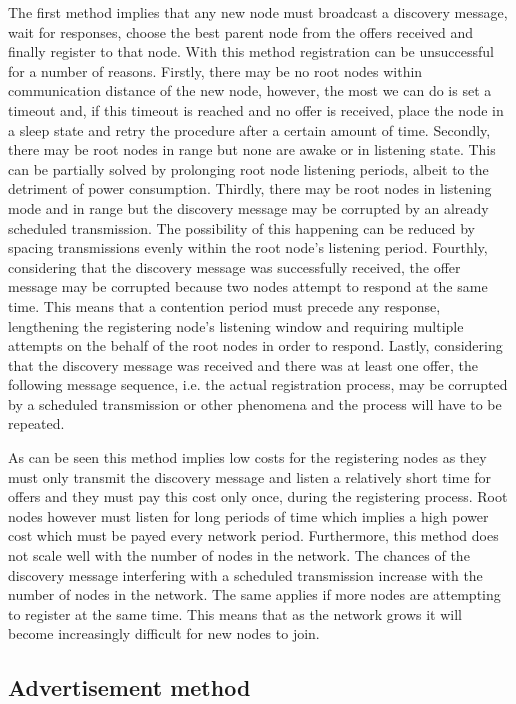 The first method implies that any new node must broadcast a discovery message,
wait for responses, choose the best parent node from the offers received and
finally register to that node. With this method registration can be
unsuccessful for a number of reasons. Firstly, there may be no root nodes
within communication distance of the new node, however, the most we can do is
set a timeout and, if this timeout is reached and no offer is received, place
the node in a sleep state and retry the procedure after a certain amount of
time. Secondly, there may be root nodes in range but none are awake or in
listening state. This can be partially solved by prolonging root node listening
periods, albeit to the detriment of power consumption. Thirdly, there may be
root nodes in listening mode and in range but the discovery message may be
corrupted by an already scheduled transmission. The possibility of this
happening can be reduced by spacing transmissions evenly within the root node's
listening period. Fourthly, considering that the discovery message was
successfully received, the offer message may be corrupted because two nodes
attempt to respond at the same time. This means that a contention period must
precede any response, lengthening the registering node's listening window and
requiring multiple attempts on the behalf of the root nodes in order to
respond. Lastly, considering that the discovery message was received and there
was at least one offer, the following message sequence, i.e. the actual
registration process, may be corrupted by a scheduled transmission or other
phenomena and the process will have to be repeated.

As can be seen this method implies low costs for the registering nodes as they
must only transmit the discovery message and listen a relatively short time for
offers and they must pay this cost only once, during the registering process.
Root nodes however must listen for long periods of time which implies a high
power cost which must be payed every network period. Furthermore, this method
does not scale well with the number of nodes in the network. The chances of the
discovery message interfering with a scheduled transmission increase with the
number of nodes in the network. The same applies if more nodes are attempting
to register at the same time. This means that as the network grows it will
become increasingly difficult for new nodes to join.

\subsection{Advertisement method}

